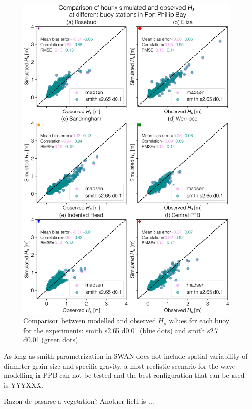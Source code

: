 \documentclass[12pt]{article}
\begin{document}
\begin{figure}[h]
    \centering
    \includegraphics[scale=0.7]{plots/scatter/madsen_vs_smith s2.65 d0.1_vert_sca.png}
    \caption{Comparison between modelled and observed $H_{s}$ values for each buoy for the experiments: smith s2.65 d0.01 (blue dots) and smith s2.7 d0.01 (green dots)}
    \label{fig:scatter_smith_s2.65_vs_smith_s2.75}
\end{figure}

As long as smith parametrization in SWAN does not include spatial variability of diameter grain size and specific gravity, a most realistic scenario for the wave modelling in PPB can not be tested and the best configuration that can be used is YYYXXX. 

Razon de pasarse a vegetation? Another field is ...
\end{document}
